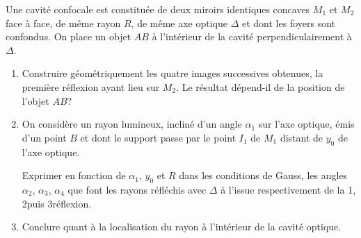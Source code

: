 \begin{exercice}%
  Une cavité confocale est constituée de deux miroirs identiques concaves 
  \(M_1\) et \(M_2\) face à face, de même rayon \(R\), de même axe optique 
  \(\Delta\) et dont les foyers sont confondus. On place un objet \(AB\) à 
  l'intérieur de la cavité perpendiculairement à \(\Delta\).
%
  \begin{enumerate}
  \item Construire géométriquement les quatre images successives obtenues, la 
    première réflexion ayant lieu sur \(M_2\). Le résultat dépend-il de la 
      position de l'objet \(AB\)?
  \item On considère un rayon lumineux, incliné d'un angle \(\alpha_1\) sur 
    l'axe optique, émis d'un point \(B\) et dont le support passe par le point 
      \(I_1\) de \(M_1\) distant de \(y_0\) de l'axe optique.

    Exprimer en fonction de \(\alpha_1\), \(y_0\) et \(R\) dans les conditions 
      de Gauss, les angles \(\alpha_2\), \(\alpha_3\), \(\alpha_4\) que font 
      les rayons réfléchis avec \(\Delta\) à l'issue respectivement de la 
      1\iere, 2\ieme puis 3\ieme réflexion.
  \item Conclure quant à la localisation du rayon à l'intérieur de la cavité 
    optique.
  \end{enumerate}
\end{exercice}%
%
